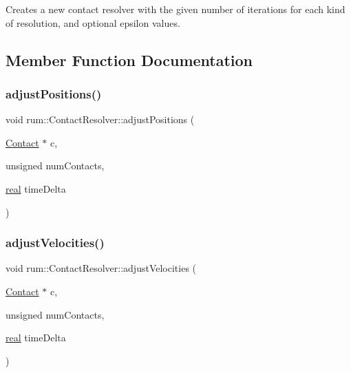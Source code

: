 Creates a new contact resolver with the given number of iterations for each kind of resolution, and optional epsilon values. 

\subsection{Member Function Documentation}
\mbox{\label{classrum_1_1_contact_resolver_aa926dab40e3e591854ef0cc707a7fd74}} 
\subsubsection{\texorpdfstring{adjust\+Positions()}{adjustPositions()}}
{\footnotesize\ttfamily void rum\+::\+Contact\+Resolver\+::adjust\+Positions (\begin{DoxyParamCaption}\item[{\mbox{\hyperlink{classrum_1_1_contact}{Contact}} $\ast$}]{c,  }\item[{unsigned}]{num\+Contacts,  }\item[{\mbox{\hyperlink{namespacerum_a7e8cca23573d5eaead0f138cbaa4862c}{real}}}]{time\+Delta }\end{DoxyParamCaption})}

\mbox{\label{classrum_1_1_contact_resolver_ae598b9b8332a1293ec59e4e20f6e3043}} 
\subsubsection{\texorpdfstring{adjust\+Velocities()}{adjustVelocities()}}
{\footnotesize\ttfamily void rum\+::\+Contact\+Resolver\+::adjust\+Velocities (\begin{DoxyParamCaption}\item[{\mbox{\hyperlink{classrum_1_1_contact}{Contact}} $\ast$}]{c,  }\item[{unsigned}]{num\+Contacts,  }\item[{\mbox{\hyperlink{namespacerum_a7e8cca23573d5eaead0f138cbaa4862c}{real}}}]{time\+Delta }\end{DoxyParamCaption})}


